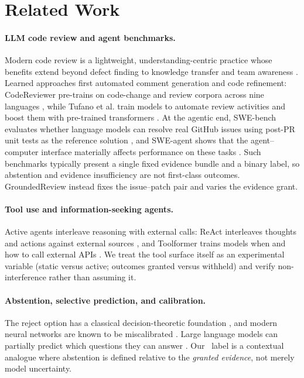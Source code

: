 \section{Related Work}
\label{sec:related}

\paragraph{LLM code review and agent benchmarks.}
Modern code review is a lightweight, understanding-centric practice whose
benefits extend beyond defect finding to knowledge transfer and team awareness
\citep{bacchelli2013expectations}. Learned approaches first automated comment
generation and code refinement: CodeReviewer pre-trains on code-change and
review corpora across nine languages \citep{li2022codereviewer}, while
Tufano et al. train models to automate review activities and boost them with
pre-trained transformers \citep{tufano2021towards,tufano2022using}. At the
agentic end, SWE-bench evaluates whether language models can resolve real
GitHub issues using post-PR unit tests as the reference solution
\citep{jimenez2024swebench}, and SWE-agent shows that the agent--computer
interface materially affects performance on these tasks
\citep{yang2024sweagent}. Such benchmarks typically present a single fixed
evidence bundle and a binary label, so abstention and evidence insufficiency
are not first-class outcomes. GroundedReview instead fixes the issue--patch
pair and varies the evidence grant.

\paragraph{Tool use and information-seeking agents.}
Active agents interleave reasoning with external calls: ReAct interleaves
thoughts and actions against external sources \citep{yao2023react}, and
Toolformer trains models when and how to call external APIs
\citep{schick2023toolformer}. We treat the tool surface itself as an
experimental variable (static versus active; outcomes granted versus withheld)
and verify non-interference rather than assuming it.

\paragraph{Abstention, selective prediction, and calibration.}
The reject option has a classical decision-theoretic foundation
\citep{chow1957optimum}, and modern neural networks are known to be
miscalibrated \citep{guo2017calibration}. Large language models can partially
predict which questions they can answer \citep{kadavath2022know}. Our \NEED\
label is a contextual analogue where abstention is defined relative to the
\emph{granted evidence}, not merely model uncertainty.

